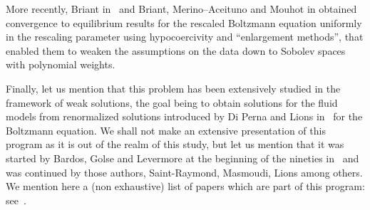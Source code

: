 More recently, Briant in~\cite{Briant} and Briant, Merino--Aceituno and Mouhot in\linebreak\cite{Briant-Mouhot-Merino} obtained convergence to equilibrium results for the rescaled Boltzmann equation uniformly in the rescaling parameter using hypocoercivity and ``enlargement methods'', that enabled them to weaken the assumptions on the data down to Sobolev spaces with polynomial weights.

Finally, let us mention that this problem has been extensively studied in the framework of weak solutions, the goal being to obtain solutions for the fluid models from renormalized solutions introduced by Di Perna and Lions in~\cite{DiPerna-Lions} for the Boltzmann equation. We shall not make an extensive presentation of this program as it is out of the realm of this study, but let us mention that it was started by Bardos, Golse and Levermore at the beginning of the nineties in~\cite{bgl1,bgl2} and was continued by those authors, Saint-Raymond, Masmoudi, Lions among others. We mention here a (non exhaustive) list of papers which are part of this program: see~\cite{GSR1,GSR2,Levermore-Masmoudi,lionsmasmoudi,Saint-Raymond}.


